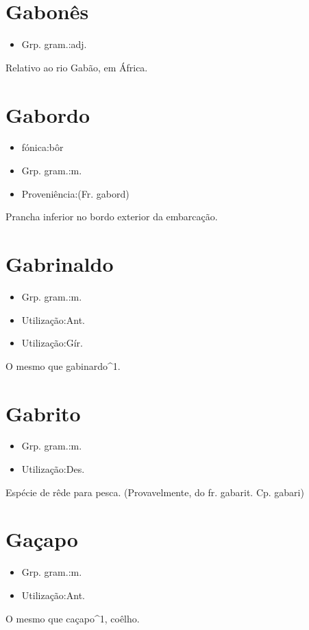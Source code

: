 \section{Gabonês}
\begin{itemize}
\item {Grp. gram.:adj.}
\end{itemize}
Relativo ao rio Gabão, em África.
\section{Gabordo}
\begin{itemize}
\item {fónica:bôr}
\end{itemize}
\begin{itemize}
\item {Grp. gram.:m.}
\end{itemize}
\begin{itemize}
\item {Proveniência:(Fr. \textunderscore gabord\textunderscore )}
\end{itemize}
Prancha inferior no bordo exterior da embarcação.
\section{Gabrinaldo}
\begin{itemize}
\item {Grp. gram.:m.}
\end{itemize}
\begin{itemize}
\item {Utilização:Ant.}
\end{itemize}
\begin{itemize}
\item {Utilização:Gír.}
\end{itemize}
O mesmo que \textunderscore gabinardo\textunderscore ^1.
\section{Gabrito}
\begin{itemize}
\item {Grp. gram.:m.}
\end{itemize}
\begin{itemize}
\item {Utilização:Des.}
\end{itemize}
Espécie de rêde para pesca.
(Provavelmente, do fr. \textunderscore gabarit\textunderscore . Cp. \textunderscore gabari\textunderscore )
\section{Gaçapo}
\begin{itemize}
\item {Grp. gram.:m.}
\end{itemize}
\begin{itemize}
\item {Utilização:Ant.}
\end{itemize}
O mesmo que \textunderscore caçapo\textunderscore ^1, coêlho.
